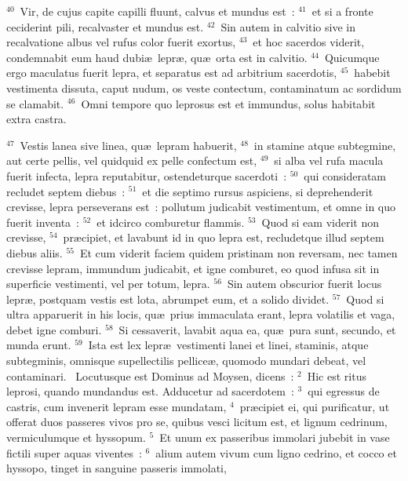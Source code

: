 ${}^{40}$~Vir, de cujus capite capilli fluunt, calvus et mundus est~:
${}^{41}$~et si a fronte ceciderint pili, recalvaster et mundus est.
${}^{42}$~Sin autem in calvitio sive in recalvatione albus vel rufus color fuerit exortus,
${}^{43}$~et hoc sacerdos viderit, condemnabit eum haud dubi\ae\ lepr\ae , qu\ae\ orta est in calvitio.
${}^{44}$~Quicumque ergo maculatus fuerit lepra, et separatus est ad arbitrium sacerdotis,
${}^{45}$~habebit vestimenta dissuta, caput nudum, os veste contectum, contaminatum ac sordidum se clamabit.
${}^{46}$~Omni tempore quo leprosus est et immundus, solus habitabit extra castra.


${}^{47}$~Vestis lanea sive linea, qu\ae\ lepram habuerit,
${}^{48}$~in stamine atque subtegmine, aut certe pellis, vel quidquid ex pelle confectum est,
${}^{49}$~si alba vel rufa macula fuerit infecta, lepra reputabitur, ostendeturque sacerdoti~:
${}^{50}$~qui consideratam recludet septem diebus~:
${}^{51}$~et die septimo rursus aspiciens, si deprehenderit crevisse, lepra perseverans est~: pollutum judicabit vestimentum, et omne in quo fuerit inventa~:
${}^{52}$~et idcirco comburetur flammis.
${}^{53}$~Quod si eam viderit non crevisse,
${}^{54}$~pr\ae cipiet, et lavabunt id in quo lepra est, recludetque illud septem diebus aliis.
${}^{55}$~Et cum viderit faciem quidem pristinam non reversam, nec tamen crevisse lepram, immundum judicabit, et igne comburet, eo quod infusa sit in superficie vestimenti, vel per totum, lepra.
${}^{56}$~Sin autem obscurior fuerit locus lepr\ae , postquam vestis est lota, abrumpet eum, et a solido dividet.
${}^{57}$~Quod si ultra apparuerit in his locis, qu\ae\ prius immaculata erant, lepra volatilis et vaga, debet igne comburi.
${}^{58}$~Si cessaverit, lavabit aqua ea, qu\ae\ pura sunt, secundo, et munda erunt.
${}^{59}$~Ista est lex lepr\ae\ vestimenti lanei et linei, staminis, atque subtegminis, omnisque supellectilis pellice\ae , quomodo mundari debeat, vel contaminari.
~\lettrine[lines=10,image=true,loversize=0.05,lraise=-0.03]{L}{}ocutusque est Dominus ad Moysen, dicens~:
${}^{2}$~Hic est ritus leprosi, quando mundandus est. Adducetur ad sacerdotem~:
${}^{3}$~qui egressus de castris, cum invenerit lepram esse mundatam,
${}^{4}$~pr\ae cipiet ei, qui purificatur, ut offerat duos passeres vivos pro se, quibus vesci licitum est, et lignum cedrinum, vermiculumque et hyssopum.
${}^{5}$~Et unum ex passeribus immolari jubebit in vase fictili super aquas viventes~:
${}^{6}$~alium autem vivum cum ligno cedrino, et cocco et hyssopo, tinget in sanguine passeris immolati,
